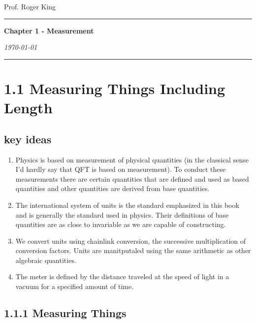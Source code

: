 \documentclass{article}
\begin{document}
 \hfill Prof. Roger King\\

\hrule

\begin{center}
    \vspace{14pt}
    \textbf{\LARGE Chapter 1 - Measurement} \\
    \vspace{12pt}

    \textit{\today}
    \vspace{14pt}
\end{center}

\hrule

\section*{1.1 Measuring Things Including Length}

\subsection*{key ideas}
\begin{enumerate}
	\item Physics is based on measurement of physical quantities (in the classical sense I'd hardly say that QFT is based on measurement). To conduct these measurements there are certain quantities that are defined and used as based quantities and other quantities are derived from base quantities.
	\item The international system of units is the standard emphasized in this book and is generally the standard used in physics. Their definitions of base quantities are as close to invariable as we are capable of constructing.
	\item We convert units using chainlink conversion, the successive multiplication of conversion factors. Units are manitputaled using the same arithmetic as other algebraic quantities.
	\item The meter is defined by the distance traveled at the speed of light in a vacuum for a specified amount of time.
\end{enumerate}

\subsection*{1.1.1 Measuring Things}
\end{document}
